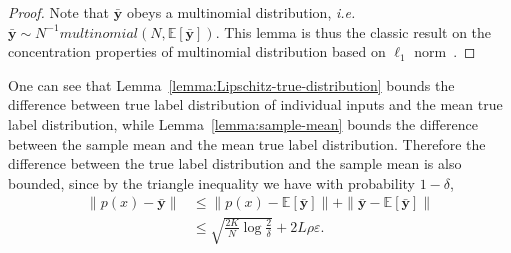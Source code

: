 \begin{proof}
Note that $\mathbf{\bar{y}}$ obeys a multinomial distribution, \emph{i.e.} $\mathbf{\bar{y}} \sim N^{-1} multinomial(N, \mathbb{E}[\mathbf{\bar{y}}])$.
This lemma is thus the classic result on the concentration properties of multinomial distribution based on $\ell_1$ norm~\cite{Weissman2003InequalitiesFT, Qian2020ConcentrationIF}.
\end{proof}

One can see that Lemma~\ref{lemma:Lipschitz-true-distribution} bounds the difference between true label distribution of individual inputs and the mean true label distribution, while Lemma~\ref{lemma:sample-mean} bounds the difference between the sample mean and the mean true label distribution. Therefore the difference between the true label distribution and the sample mean is also bounded, since by the triangle inequality we have with probability $1 - \delta$,
\begin{equation}
    \begin{aligned}
    \|p(x) - \bar{\mathbf{y}} \| 
    & \le \|p(x) - \mathbb{E}[\bar{\mathbf{y}}] \| + \| \bar{\mathbf{y}} - \mathbb{E}[\bar{\mathbf{y}}] \| \\
    & \le \sqrt{\frac{2K}{N}\log \frac{2}{\delta}} + 2L\rho\varepsilon.
    \end{aligned}
\end{equation}

